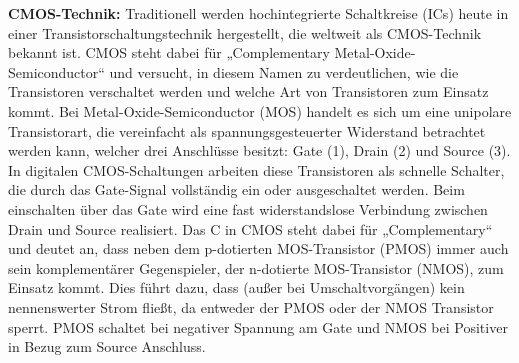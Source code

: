 \documentclass[a4paper]{article}
\begin{document}
	\pagestyle{empty}   %
	
	\setlength{\parindent}{0pt}
	\setlength{\parskip}{1em} %
	
	\textbf{CMOS-Technik:} Traditionell werden hochintegrierte Schaltkreise (ICs) heute in einer Transistorschaltungstechnik hergestellt, die weltweit als CMOS-Technik bekannt ist. 
	CMOS steht dabei für „Complementary Metal-Oxide-Semiconductor“ und versucht, in diesem Namen zu verdeutlichen, wie die Transistoren verschaltet werden und welche Art von Transistoren zum Einsatz kommt.
	Bei Metal-Oxide-Semiconductor (MOS) handelt es sich um eine unipolare Transistorart, die vereinfacht als spannungsgesteuerter Widerstand betrachtet werden kann, welcher drei Anschlüsse besitzt: Gate (1), Drain (2) und Source (3). In digitalen CMOS-Schaltungen arbeiten diese Transistoren als schnelle Schalter, die durch das Gate-Signal vollständig ein oder ausgeschaltet werden. Beim einschalten über das Gate wird eine fast widerstandslose Verbindung zwischen Drain und Source realisiert. Das C in CMOS steht dabei für „Complementary“ und deutet an, dass neben dem p-dotierten MOS-Transistor (PMOS) immer auch sein komplementärer Gegenspieler, der n-dotierte MOS-Transistor (NMOS), zum Einsatz kommt. Dies führt dazu, dass (außer bei Umschaltvorgängen) kein nennenswerter Strom fließt, da entweder der PMOS oder der NMOS Transistor sperrt. PMOS schaltet bei negativer Spannung am Gate und NMOS bei Positiver in Bezug zum Source Anschluss.
 
	\vspace{0.2cm} %
	
\end{document}
